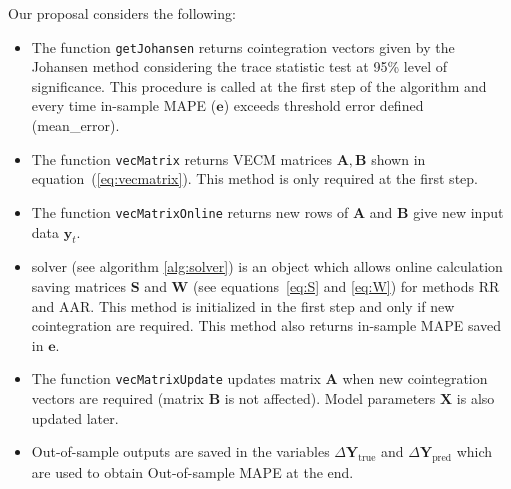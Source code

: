 Our proposal considers the following:

\begin{itemize}
\item The function \texttt{getJohansen} returns cointegration vectors given by the
Johansen method considering the trace statistic test at 95\% level of
significance. This procedure is called at the first step of the algorithm and
every time in-sample MAPE ($\mathbf{e}$) exceeds threshold error defined (mean\_error).
\item The function \texttt{vecMatrix} returns VECM
matrices $\mathbf{A},\mathbf{B}$ shown in equation~(\ref{eq:vecmatrix}). This
method is only required at the first step.
\item The function \texttt{vecMatrixOnline} returns new rows of $\mathbf{A}$ and
$\mathbf{B}$ give new input data $\mathbf{y}_t$.
\item solver (see algorithm \ref{alg:solver}) is an object which allows online
calculation saving matrices $\mathbf{S}$ and $\mathbf{W}$ (see
equations~\ref{eq:S} and \ref{eq:W}) for methods RR and AAR. This method is
initialized in the first step and only if new cointegration are required. This
method also returns in-sample MAPE saved in $\mathbf{e}$. 
\item The function \texttt{vecMatrixUpdate} updates matrix $\mathbf{A}$ when new
cointegration vectors are required (matrix $\mathbf{B}$ is not affected). Model
parameters $\mathbf{X}$ is also updated later.
\item Out-of-sample outputs are saved in the variables $\Delta
\mathbf{Y}_{\text{true}}$ and $\Delta \mathbf{Y}_{\text{pred}}$ which are used
to obtain Out-of-sample MAPE at the end.
\end{itemize}




